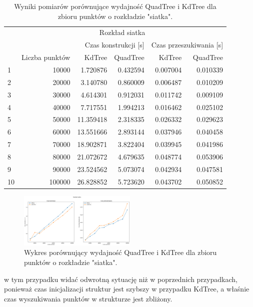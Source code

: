 \documentclass{lab}
\begin{document}
\begin{table}[H]
\centering
\begin{tabular}{lrrrrr}
  \toprule
   & \multicolumn{5}{c}{Rozkład siatka} \\
   &  & \multicolumn{2}{r}{Czas konstrukcji [s]} & \multicolumn{2}{r}{Czas przeszukiwania [s]} \\
   & Liczba punktów & KdTree & QuadTree & KdTree & QuadTree \\
  \midrule
  1 & 10000 & 1.720876 & 0.432594 & 0.007004 & 0.010339 \\
  2 & 20000 & 3.140780 & 0.860009 & 0.006487 & 0.010209 \\
  3 & 30000 & 4.614301 & 0.912031 & 0.011742 & 0.009109 \\
  4 & 40000 & 7.717551 & 1.994213 & 0.016462 & 0.025102 \\
  5 & 50000 & 11.359418 & 2.318335 & 0.026332 & 0.029623 \\
  6 & 60000 & 13.551666 & 2.893144 & 0.037946 & 0.040458 \\
  7 & 70000 & 18.902871 & 3.822404 & 0.039945 & 0.041986 \\
  8 & 80000 & 21.072672 & 4.679635 & 0.048774 & 0.053906 \\
  9 & 90000 & 23.524562 & 5.073074 & 0.042934 & 0.047581 \\
  10 & 100000 & 26.828852 & 5.723620 & 0.043702 & 0.050852 \\
  \bottomrule
  \end{tabular}
\caption{Wyniki pomiarów porównujące wydajność QuadTree i KdTree dla zbioru punktów o rozkładzie "siatka".}
\label{tab:grid_time}
\end{table}

\begin{figure}[H]
  \centering
  \includegraphics[width=0.5\textwidth]{resources/grid_graph.png}
  \caption{Wykres porównujący wydajność QuadTree i KdTree dla zbioru punktów o rozkładzie "siatka".}
  \label{fig:grid_graph}
\end{figure}

w tym przypadku widać odwrotną sytuację niż w poprzednich przypadkach, ponieważ czas inicjalizacji struktur jest szybszy w przypadku KdTree, a właśnie czas wyszukiwania punktów w strukturze jest zbliżony.
\end{document}
